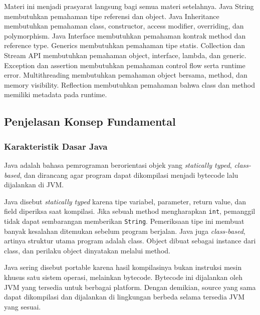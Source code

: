 Materi ini menjadi prasyarat langsung bagi semua materi setelahnya. Java String membutuhkan pemahaman tipe referensi dan object. Java Inheritance membutuhkan pemahaman class, constructor, access modifier, overriding, dan polymorphism. Java Interface membutuhkan pemahaman kontrak method dan reference type. Generics membutuhkan pemahaman tipe statis. Collection dan Stream API membutuhkan pemahaman object, interface, lambda, dan generic. Exception dan assertion membutuhkan pemahaman control flow serta runtime error. Multithreading membutuhkan pemahaman object bersama, method, dan memory visibility. Reflection membutuhkan pemahaman bahwa class dan method memiliki metadata pada runtime.

\subsection{Penjelasan Konsep Fundamental}

\subsubsection{Karakteristik Dasar Java}

\begin{jawab}
Java adalah bahasa pemrograman berorientasi objek yang \textit{statically typed}, \textit{class-based}, dan dirancang agar program dapat dikompilasi menjadi bytecode lalu dijalankan di JVM.
\end{jawab}

Java disebut \textit{statically typed} karena tipe variabel, parameter, return value, dan field diperiksa saat kompilasi. Jika sebuah method mengharapkan \texttt{int}, pemanggil tidak dapat sembarangan memberikan \texttt{String}. Pemeriksaan tipe ini membuat banyak kesalahan ditemukan sebelum program berjalan. Java juga \textit{class-based}, artinya struktur utama program adalah class. Object dibuat sebagai instance dari class, dan perilaku object dinyatakan melalui method.

Java sering disebut portable karena hasil kompilasinya bukan instruksi mesin khusus satu sistem operasi, melainkan bytecode. Bytecode ini dijalankan oleh JVM yang tersedia untuk berbagai platform. Dengan demikian, source yang sama dapat dikompilasi dan dijalankan di lingkungan berbeda selama tersedia JVM yang sesuai.

